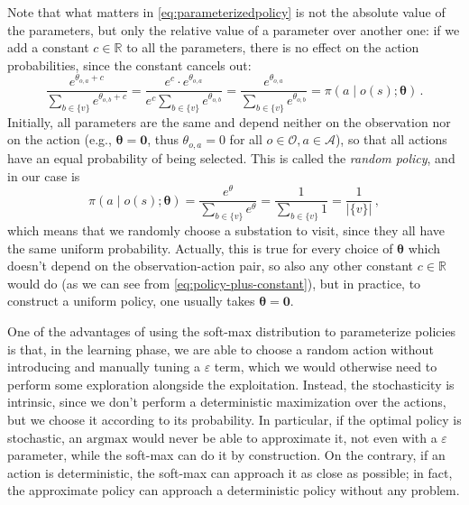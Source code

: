 Note that what matters in \eqref{eq:parameterizedpolicy} is not the absolute value of the parameters, but only the relative value of a parameter over another one: if we add a constant $c \in \mathbb R$ to all the parameters, there is no effect on the action probabilities, since the constant cancels out:
\begin{equation}
    \frac{e^{\theta_{o,a} + c}}{\sum_{b \in \{v\}} e^{\theta_{o,b} + c}}
    = \frac{e^c\cdot e^{\theta_{o,a} }}{e^c \sum_{b \in \{v\}} e^{\theta_{o,b}}}
    = \frac{e^{\theta_{o,a} }}{\sum_{b \in \{v\}} e^{\theta_{o,b} }}
    = \pi( a \mid o(s); \boldsymbol \theta) \, .
    \label{eq:policy-plus-constant}
\end{equation}
Initially, all parameters are the same and depend neither on the observation nor on the action (e.g., $\boldsymbol \theta = \mathbf 0$, thus $\theta_{o,a} = 0$ for all $o \in \mathcal O, a \in \mathcal A$), so that all actions have an equal probability of being selected. This is called the \emph{random policy}, and in our case is
\begin{equation}
    \pi \left( a \;\big|\; o(s); \boldsymbol \theta \right) = \frac{e^{\theta}}{\sum_{b \in \{v\}} e^{\theta}} = \frac{1}{\sum_{b \in \{v\}} 1 } = \frac1{ |\{v\}| } \, ,
    \label{eq:rndpolicy}
\end{equation}
which means that we randomly choose a substation to visit, since they all have the same uniform probability. Actually, this is true for every choice of $\boldsymbol \theta$ which doesn't depend on the observation-action pair, so also any other constant $c \in \mathbb R$ would do (as we can see from \eqref{eq:policy-plus-constant}), but in practice, to construct a uniform policy, one usually takes $\boldsymbol \theta = \mathbf 0$.

One of the advantages of using the soft-max distribution to parameterize policies is that, in the learning phase, we are able to choose a random action without introducing and manually tuning a $\varepsilon$ term, which we would otherwise need to perform some exploration alongside the exploitation. Instead, the stochasticity is intrinsic, since we don't perform a deterministic maximization over the actions, but we choose it according to its probability. In particular, if the optimal policy is stochastic, an $\text{argmax}$ would never be able to approximate it, not even with a $\varepsilon$ parameter, while the soft-max can do it by construction. On the contrary, if an action is deterministic, the soft-max can approach it as close as possible; in fact, the approximate policy can approach a deterministic policy without any problem. 

